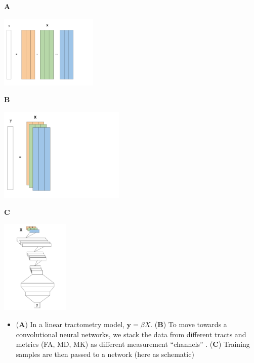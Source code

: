 \documentclass[a0paper,landscape,fontscale=0.365]{baposter}
\newenvironment{Figure}
  {\par\medskip\noindent\minipage{\linewidth}}
  {\endminipage\par\medskip}
\begin{document}
\begin{poster}
{\begin{multicols}{3}
    \textbf{A}
    \begin{Figure}
        \centering
        \includegraphics[height=3.5cm]{figures/linear-model.pdf}
    \end{Figure}
    \columnbreak
    \textbf{B}
    \begin{Figure}
        \centering
        \includegraphics[height=4.5cm]{figures/linear-to-convnet.pdf}
    \end{Figure}
    \columnbreak
    \textbf{C}
    \begin{Figure}
        \centering
        \includegraphics[height=4.5cm]{figures/convnet-schematic.pdf}
    \end{Figure}
\end{multicols}

\begin{itemize}[nosep, leftmargin=*]

\item (\textbf{A}) In a linear tractometry model, $\textbf{y} = \beta X$. (\textbf{B}) To move towards a convolutional neural networks, we stack the data from different tracts and metrics (FA, MD, MK) as different measurement ``channels'' . (\textbf{C}) Training samples are then passed to a network (here as schematic)


\end{itemize}}
\end{poster}
\end{document}
